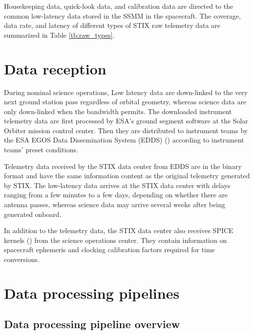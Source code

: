 \documentclass[referee]{aa} %
\begin{document}
Housekeeping data, quick-look data, and calibration data are directed to the
common low-latency data stored in the SSMM in the spacecraft.
The coverage, data rate, and latency of 
different types of STIX raw telemetry data are
summarized in Table \ref{tb:raw_types}.


\section{Data reception}

During nominal science operations,
Low latency data are down-linked to the very next ground station pass regardless of orbital geometry, 
whereas science data are only down-linked when the bandwidth permits.
The downloaded instrument telemetry data are first processed by ESA's ground segment
software at the Solar Orbiter mission control center. Then they
are distributed to instrument teams by the ESA EGOS Data
Dissemination System (EDDS) (\cite{EDDS}) according to instrument teams' preset conditions.

Telemetry data received by the STIX data center from EDDS are in the binary format and have the same
 information content as the original telemetry generated by STIX.
The low-latency data arrives at the STIX data center with delays ranging from a few minutes to a few days, depending on whether there
are antenna passes, whereas science data may arrive several weeks after being generated onboard.

In addition to the telemetry data, the STIX data center also receives SPICE kernels (\cite{spice1996,spice2018})  from the science operations center.
They contain information on spacecraft ephemeris and clocking calibration factors required for time conversions.


\section{Data processing pipelines}
\subsection{Data processing pipeline overview}
\end{document}
